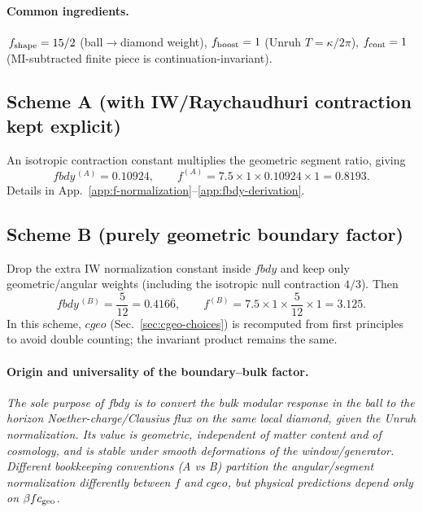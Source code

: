\documentclass[aps,prd,onecolumn,superscriptaddress,nofootinbib]{revtex4-2}
\def\cgeo{cgeo}%
\def\fbdy{fbdy}%
\newcommand{\cgeo}{c_{\rm geo}}
\newcommand{\fbdy}{f_{\rm bdy}}
\begin{document}
\paragraph*{Common ingredients.}
\(\,f_{\rm shape}=15/2\) (ball\(\to\)diamond weight), \(f_{\rm boost}=1\) (Unruh \(T=\kappa/2\pi\)), \(f_{\rm cont}=1\) (MI-subtracted finite piece is continuation-invariant).

\subsection{Scheme A (with IW/Raychaudhuri contraction kept explicit)}
An isotropic contraction constant multiplies the geometric segment ratio, giving
\[
\fbdy^{\,(A)}=0.10924,\qquad
f^{(A)}=7.5\times 1 \times 0.10924 \times 1=0.8193.
\]
Details in App.~\ref{app:f-normalization}--\ref{app:fbdy-derivation}.

\subsection{Scheme B (purely geometric boundary factor)}
Drop the extra IW normalization constant inside \(\fbdy\) and keep only geometric/angular weights (including the isotropic null contraction \(4/3\)). Then
\[
\fbdy^{\,(B)}=\frac{5}{12}=0.416\overline{6},\qquad
f^{(B)}=7.5\times 1 \times \frac{5}{12}\times 1=3.125.
\]
In this scheme, \(\cgeo\) (Sec.~\ref{sec:cgeo-choices}) is recomputed from first principles to avoid double counting; the invariant product remains the same.

\paragraph*{Origin and universality of the boundary–bulk factor.}
\emph{The sole purpose of \(\fbdy\) is to convert the \emph{bulk} modular response in the ball to the \emph{horizon} Noether-charge/Clausius flux on the same local diamond, given the Unruh normalization. Its value is \emph{geometric}, independent of matter content and of cosmology, and is stable under smooth deformations of the window/generator. Different bookkeeping conventions (A vs B) partition the angular/segment normalization differently between \(f\) and \(\cgeo\), but physical predictions depend only on \(\beta f c_{\rm geo}\).}
\end{document}
